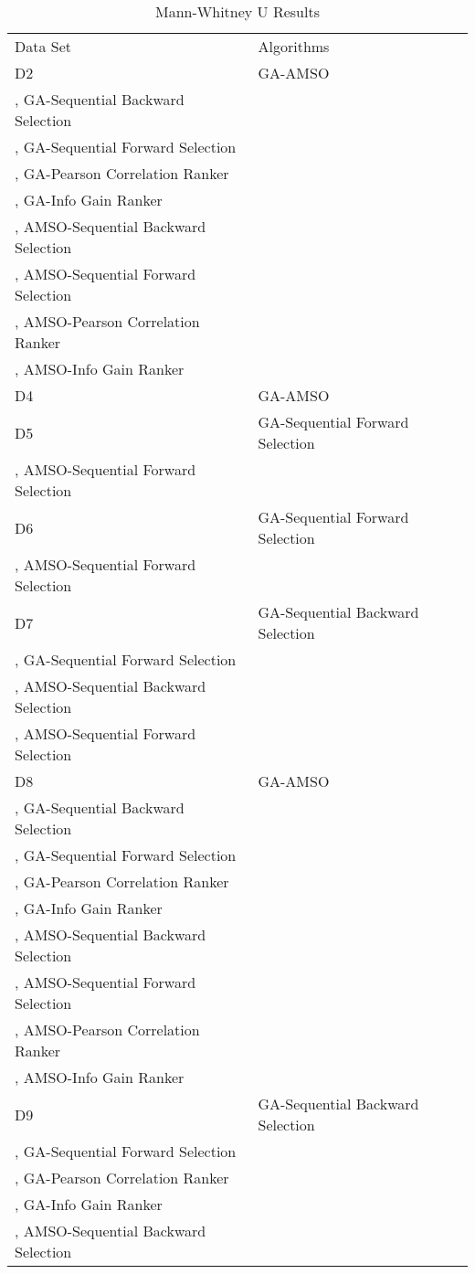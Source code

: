 \begin{table}
\caption{Mann-Whitney U Results}
\label{tbl:mann:whitney:u}
\begin{tabular}{ll}
\noalign{\smallskip}\hline\noalign{\smallskip}
Data Set & Algorithms \\
\noalign{\smallskip}\hline
D2&GA-AMSO\\
, GA-Sequential Backward Selection\\
, GA-Sequential Forward Selection\\
, GA-Pearson Correlation Ranker\\
, GA-Info Gain Ranker\\
, AMSO-Sequential Backward Selection\\
, AMSO-Sequential Forward Selection\\
, AMSO-Pearson Correlation Ranker\\
, AMSO-Info Gain Ranker\\
D4&GA-AMSO\\
D5&GA-Sequential Forward Selection\\
, AMSO-Sequential Forward Selection\\
D6&GA-Sequential Forward Selection\\
, AMSO-Sequential Forward Selection\\
D7&GA-Sequential Backward Selection\\
, GA-Sequential Forward Selection\\
, AMSO-Sequential Backward Selection\\
, AMSO-Sequential Forward Selection\\
D8&GA-AMSO\\
, GA-Sequential Backward Selection\\
, GA-Sequential Forward Selection\\
, GA-Pearson Correlation Ranker\\
, GA-Info Gain Ranker\\
, AMSO-Sequential Backward Selection\\
, AMSO-Sequential Forward Selection\\
, AMSO-Pearson Correlation Ranker\\
, AMSO-Info Gain Ranker\\
D9&GA-Sequential Backward Selection\\
, GA-Sequential Forward Selection\\
, GA-Pearson Correlation Ranker\\
, GA-Info Gain Ranker\\
, AMSO-Sequential Backward Selection\\

\end{tabular}
\end{table}
